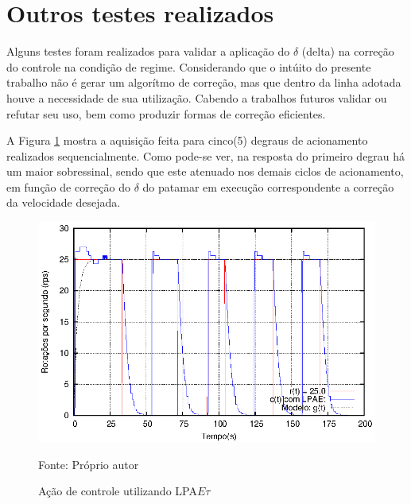 






\section{Outros testes realizados}

Alguns testes foram realizados para validar a aplicação do $\delta$
(delta) na correção do controle na condição de regime.
Considerando que o intúito do presente trabalho não é gerar um
algorítmo de correção, mas que dentro da linha adotada houve a
necessidade de sua utilização. Cabendo a trabalhos futuros validar ou
refutar seu uso, bem como produzir formas de correção eficientes. 

A Figura \ref{fig:acaoLPAEtDelta} mostra a aquisição feita para
cinco(5) degraus de acionamento realizados sequencialmente.
Como pode-se ver, na resposta do primeiro degrau há um maior
sobressinal, sendo que este atenuado nos demais ciclos de acionamento,
em função de correção do $\delta$ do patamar em execução
correspondente a correção da velocidade desejada.

\begin{figure}[!htb]%
\caption{Ação de controle utilizando LPA$E\tau$}
\vspace{-1cm}\center\includegraphics[scale=1.6]{./imagens/LPAEt-delta.eps}
\label{fig:acaoLPAEtDelta}

{\small Fonte: Próprio autor}
\end{figure}

